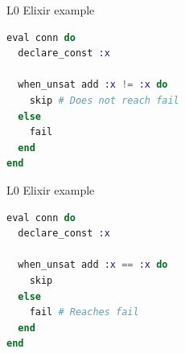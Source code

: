 \documentclass{beamer}
\begin{document}

    
    

  \begin{frame}[fragile]{L0 Elixir example}
    \small
    \begin{lstlisting}[language=elixir,numbers=none,frame=none]
eval conn do
  declare_const :x

  when_unsat add :x != :x do
    skip # Does not reach fail
  else
    fail
  end
end
    \end{lstlisting}
  \end{frame}
  \begin{frame}[fragile]{L0 Elixir example}
    \small
    \begin{lstlisting}[language=elixir,numbers=none,frame=none]
eval conn do
  declare_const :x

  when_unsat add :x == :x do
    skip
  else
    fail # Reaches fail
  end
end
    \end{lstlisting}
  \end{frame}
\end{document}
